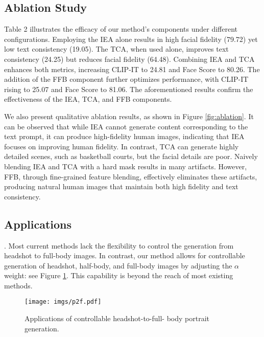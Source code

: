 % 





\subsection{Ablation Study}

Table 2 illustrates the efficacy of our method's components under different configurations. Employing the IEA alone results in high facial fidelity (79.72) yet low text consistency (19.05). The TCA, when used alone, improves text consistency (24.25) but reduces facial fidelity (64.48). Combining IEA and TCA enhances both metrics, increasing CLIP-IT to 24.81 and Face Score to 80.26. The addition of the FFB component further optimizes performance, with CLIP-IT rising to 25.07 and Face Score to 81.06. The aforementioned results confirm the effectiveness of the IEA, TCA, and FFB components.


We also present qualitative ablation results, as shown in Figure \ref{fig:ablation}. It can be observed that while IEA cannot generate content corresponding to the text prompt, it can produce high-fidelity human images, indicating that IEA focuses on improving human fidelity. In contrast, TCA can generate highly detailed scenes, such as basketball courts, but the facial details are poor. Naively blending IEA and TCA with a hard mask results in many artifacts. However, FFB, through fine-grained feature blending, effectively eliminates these artifacts, producing natural human images that maintain both high fidelity and text consistency.



\subsection{Applications}

.
Most current methods lack the flexibility to control the generation from headshot to full-body images. In contrast, our method allows for controllable generation of headshot, half-body, and full-body images by adjusting the $\alpha$ weight: see Figure \ref{fig:p2f}. This capability  is beyond the reach of most existing methods.

\begin{figure}[t]
    \centering
    \texttt{[image: imgs/p2f.pdf]} %
    \caption{Applications of controllable headshot-to-full- body portrait generation.} %
    \label{fig:p2f} %
\end{figure}




